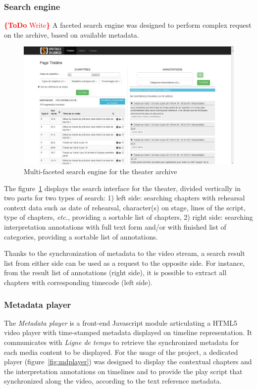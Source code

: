 \documentclass[conference]{IEEEtran}
\newcommand{\todo}[1]{\noindent\textcolor{red}{{\bf \{ToDo} #1{\bf \}}}}
\begin{document}
\subsubsection{Search engine}
\todo{Write}
A faceted search engine was designed to perform complex request on the archive, based on available metadata.

\begin{figure}[htb!]
  \centering
  \includegraphics[width=\columnwidth]{searchengine}
  \caption{Multi-faceted search engine for the theater archive}
  \label{fig:searchengine}
\end{figure}

The figure~\ref{fig:searchengine} displays the search interface for the theater, divided vertically in two parts for two types of search:
1) left side: searching chapters with rehearsal context data such as date of rehearsal, character(s) on stage, lines of the script, type of chapters, \emph{etc.}, providing a sortable list of chapters,
2) right side: searching interpretation annotations with full text form and/or with finished list of categories, providing a sortable list of annotations.

Thanks to the synchronization of metadata to the video stream, a search result list from either side can be used as a request to the opposite side. For instance, from the result list of annotations (right side), it is possible to extract all chapters with corresponding timecode (left side).

\subsubsection{Metadata player}
The \emph{Metadata player} is a front-end Javascript module articulating a HTML5 video player with time-stamped metadata displayed on timeline representation. It communicates with \emph{Ligne de temps} to retrieve the synchronized metadata for each media content to be displayed. For the usage of the project, a dedicated player (figure~\ref{fig:mdplayer}) was designed to display the contextual chapters and the interpretation annotations on timelines and to provide the play script that synchronized along the video, according to the text reference metadata.
\end{document}
